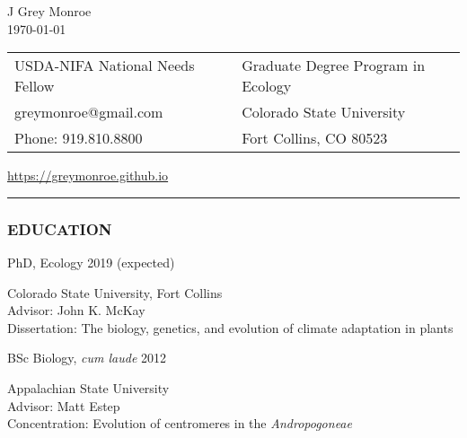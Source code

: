 \documentclass[12pt,english]{article}
\providecommand{\tabularnewline}{\\}
\begin{document}
\begin {center}
{\huge J Grey Monroe}\tabularnewline
\today

\vspace{1em}

\begin{tabular}{>{\raggedright}p{3in}>{\raggedleft}p{3in}}
USDA-NIFA National Needs Fellow & Graduate Degree Program in Ecology\tabularnewline
 greymonroe@gmail.com &  Colorado State University \tabularnewline
Phone: 919.810.8800 & Fort Collins, CO 80523\tabularnewline
\end{tabular}
\href{https://greymonroe.github.io}{https://greymonroe.github.io}
\end{center}
\vspace{-1em}

\rule[0.5ex]{1\columnwidth}{0.5pt}


\subsubsection*{EDUCATION}
\vspace{-0.5ex}

\hspace{1.0em} PhD, Ecology
\hfill 
2019 (expected)
\par
\hspace*{2.0em} Colorado State University, Fort Collins \\
\hspace*{2.0em} Advisor: John K. McKay \\
\hspace*{2.0em} Dissertation: The biology, genetics, and evolution of climate adaptation in plants 
\\
\vspace{-0.5ex}\par

\hspace{1.0em} BSc Biology, \emph{cum laude}  
\hfill
2012
\par
\hspace*{2.0em} Appalachian State University \\
\hspace*{2.0em} Advisor: Matt Estep \\
\hspace*{2.0em} Concentration: Evolution of centromeres in the \textit{Andropogoneae} \\
\end{document}
